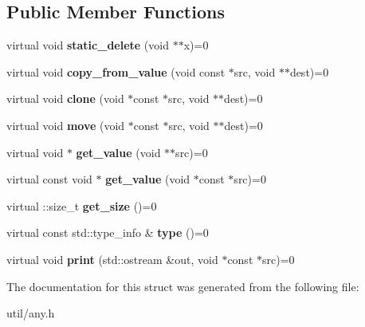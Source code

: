 \subsection*{Public Member Functions}
\begin{DoxyCompactItemize}
\item 
\mbox{\label{structtrees_1_1anyimpl_1_1base__any__policy_a1903b2367ed09fa09e1e713098bf2e4f}} 
virtual void {\bfseries static\+\_\+delete} (void $\ast$$\ast$x)=0
\item 
\mbox{\label{structtrees_1_1anyimpl_1_1base__any__policy_ac8daab6d784a637d67bb7f11f71f95ae}} 
virtual void {\bfseries copy\+\_\+from\+\_\+value} (void const $\ast$src, void $\ast$$\ast$dest)=0
\item 
\mbox{\label{structtrees_1_1anyimpl_1_1base__any__policy_a82c84416680aa71ec9cf68d4c987f299}} 
virtual void {\bfseries clone} (void $\ast$const $\ast$src, void $\ast$$\ast$dest)=0
\item 
\mbox{\label{structtrees_1_1anyimpl_1_1base__any__policy_a4bca59609ae5fc7ebc9bbe20fc8d0686}} 
virtual void {\bfseries move} (void $\ast$const $\ast$src, void $\ast$$\ast$dest)=0
\item 
\mbox{\label{structtrees_1_1anyimpl_1_1base__any__policy_adcd3a116177e228820e6b312b061c4f8}} 
virtual void $\ast$ {\bfseries get\+\_\+value} (void $\ast$$\ast$src)=0
\item 
\mbox{\label{structtrees_1_1anyimpl_1_1base__any__policy_ae027b10d4a06a85a95c5ed974e0a210d}} 
virtual const void $\ast$ {\bfseries get\+\_\+value} (void $\ast$const $\ast$src)=0
\item 
\mbox{\label{structtrees_1_1anyimpl_1_1base__any__policy_a02f38616030b7fd8c16ee64496c9d851}} 
virtual \+::size\+\_\+t {\bfseries get\+\_\+size} ()=0
\item 
\mbox{\label{structtrees_1_1anyimpl_1_1base__any__policy_abc06c39bfd9c3c09d04a4f2abd30efa1}} 
virtual const std\+::type\+\_\+info \& {\bfseries type} ()=0
\item 
\mbox{\label{structtrees_1_1anyimpl_1_1base__any__policy_a993b0181f080c500084eb969e33ba7cc}} 
virtual void {\bfseries print} (std\+::ostream \&out, void $\ast$const $\ast$src)=0
\end{DoxyCompactItemize}


The documentation for this struct was generated from the following file\+:\begin{DoxyCompactItemize}
\item 
util/any.\+h\end{DoxyCompactItemize}
